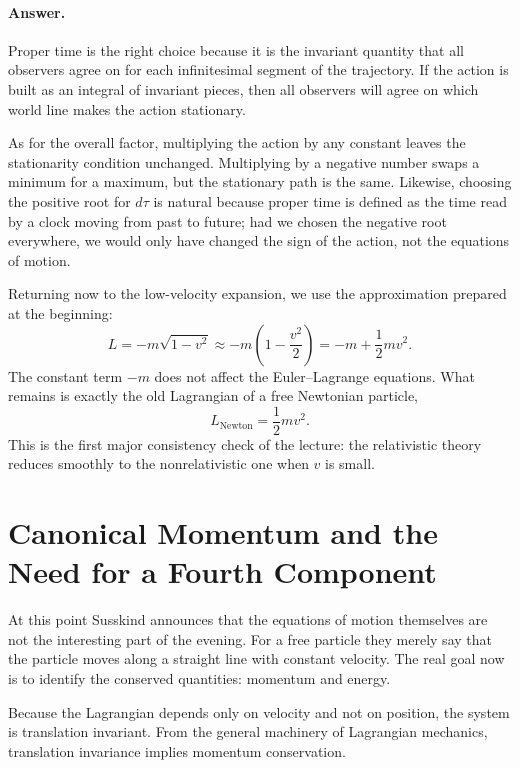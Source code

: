\paragraph{Answer.}
Proper time is the right choice because it is the invariant quantity that all observers agree on for each infinitesimal segment of the trajectory. If the action is built as an integral of invariant pieces, then all observers will agree on which world line makes the action stationary.

As for the overall factor, multiplying the action by any constant leaves the stationarity condition unchanged. Multiplying by a negative number swaps a minimum for a maximum, but the stationary path is the same. Likewise, choosing the positive root for \(d\tau\) is natural because proper time is defined as the time read by a clock moving from past to future; had we chosen the negative root everywhere, we would only have changed the sign of the action, not the equations of motion.

Returning now to the low-velocity expansion, we use the approximation prepared at the beginning:
\begin{equation}
L
=
-m\sqrt{1-v^2}
\approx
-m\left(1-\frac{v^2}{2}\right)
=
-m+\frac12 mv^2.
\end{equation}
The constant term \(-m\) does not affect the Euler--Lagrange equations. What remains is exactly the old Lagrangian of a free Newtonian particle,
\begin{equation}
L_{\text{Newton}}=\frac12 mv^2.
\end{equation}
This is the first major consistency check of the lecture: the relativistic theory reduces smoothly to the nonrelativistic one when \(v\) is small.

\section{Canonical Momentum and the Need for a Fourth Component}

At this point Susskind announces that the equations of motion themselves are not the interesting part of the evening. For a free particle they merely say that the particle moves along a straight line with constant velocity. The real goal now is to identify the conserved quantities: momentum and energy.

Because the Lagrangian depends only on velocity and not on position, the system is translation invariant. From the general machinery of Lagrangian mechanics, translation invariance implies momentum conservation.

